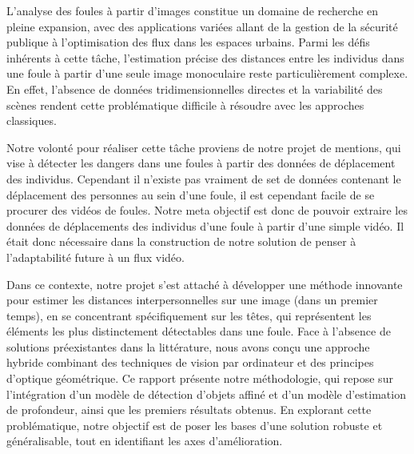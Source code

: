  L’analyse des foules à partir d’images constitue un domaine de recherche en pleine expansion, avec des applications variées allant de la gestion de la sécurité publique à l’optimisation des flux dans les espaces urbains. Parmi les défis inhérents à cette tâche, l’estimation précise des distances entre les individus dans une foule à partir d’une seule image monoculaire reste particulièrement complexe. En effet, l’absence de données tridimensionnelles directes et la variabilité des scènes rendent cette problématique difficile à résoudre avec les approches classiques. 

Notre volonté pour réaliser cette tâche proviens de notre projet de mentions, qui vise à détecter les dangers dans une foules à partir des données de déplacement des individus. Cependant il n'existe pas vraiment de set de données contenant le déplacement des personnes au sein d'une foule, il est cependant facile de se procurer des vidéos de foules. Notre meta objectif est donc de pouvoir extraire les données de déplacements des individus d'une foule à partir d'une simple vidéo. Il était donc nécessaire dans la construction de notre solution de penser à l'adaptabilité future à un flux vidéo.

Dans ce contexte, notre projet s’est attaché à développer une méthode innovante pour estimer les distances interpersonnelles sur une image (dans un premier temps), en se concentrant spécifiquement sur les têtes, qui représentent les éléments les plus distinctement détectables dans une foule. Face à l’absence de solutions préexistantes dans la littérature, nous avons conçu une approche hybride combinant des techniques de vision par ordinateur et des principes d’optique géométrique. Ce rapport présente notre méthodologie, qui repose sur l’intégration d’un modèle de détection d’objets affiné et d’un modèle d’estimation de profondeur, ainsi que les premiers résultats obtenus. En explorant cette problématique, notre objectif est de poser les bases d’une solution robuste et généralisable, tout en identifiant les axes d’amélioration.